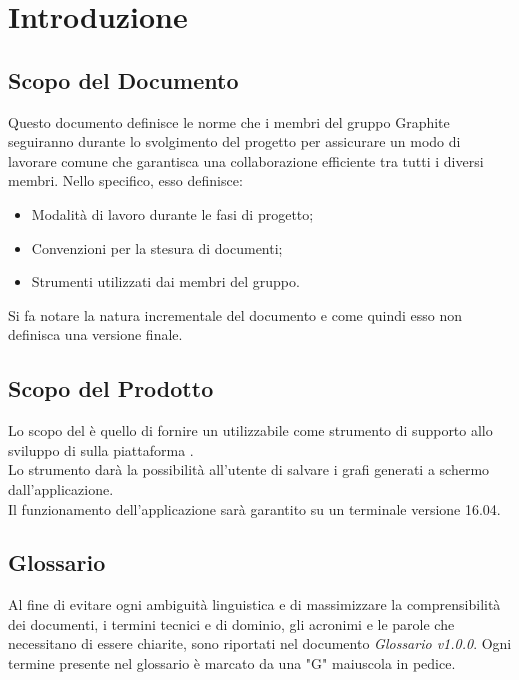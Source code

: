 \documentclass[./NormediProgetto.tex]{subfiles}
\begin{document}
	
\chapter{Introduzione}

\section{Scopo del Documento}

Questo documento definisce le norme che i membri del gruppo Graphite seguiranno durante lo svolgimento del progetto per assicurare un modo di lavorare comune che garantisca una collaborazione efficiente tra tutti i diversi
membri. Nello specifico, esso definisce:

\begin{itemize}
	\item Modalità di lavoro durante le fasi di progetto;
	\item Convenzioni per la stesura di documenti;
	\item Strumenti utilizzati dai membri del gruppo.
\end{itemize}
Si fa notare la natura incrementale del documento e come quindi esso non definisca una versione finale.
\section{Scopo del Prodotto}

Lo scopo del  è quello di fornire un  utilizzabile come strumento di supporto allo sviluppo di  sulla piattaforma . 
\\ \noindent Lo strumento darà la possibilità all'utente di salvare i grafi generati a schermo dall'applicazione.
\\ \noindent Il funzionamento dell'applicazione sarà garantito su un terminale  versione 16.04.

\section{Glossario}

Al fine di evitare ogni ambiguità linguistica e di massimizzare la comprensibilità dei documenti, i termini tecnici e di dominio, gli acronimi e le parole che necessitano di essere chiarite, sono riportati nel documento \textit{Glossario v1.0.0}.
Ogni termine presente nel glossario è marcato da una "G" maiuscola in pedice.
\end{document}
